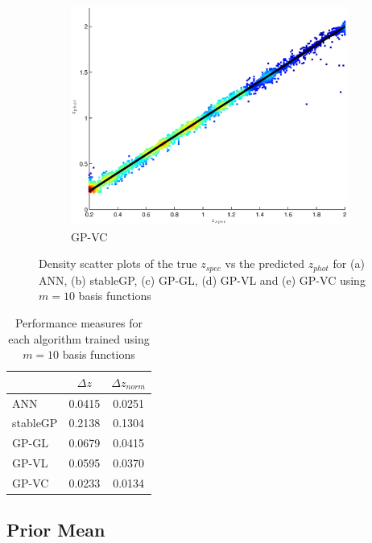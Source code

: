 \documentclass[useAMS,usenatbib,fleqn]{mn2e}
\begin{document}
\begin{figure}
\begin{subfigure}[b]{0.175\textwidth}
                \includegraphics[width=\textwidth]{figures/GPVC.eps}
                \caption{GP-VC}
        \end{subfigure}
        
        \caption{Density scatter plots of the true $z_{spec}$ vs the predicted $z_{phot}$ for (a) ANN, (b) stableGP, (c) GP-GL, (d) GP-VL and (e) GP-VC using $m=10$ basis functions}
        \label{fig-experiment-1}
\end{figure}

 \begin{table}
\caption{Performance measures for each algorithm trained using $m=10$ basis functions}
\begin{center}
  \begin{tabular}{| l | c | c | }
     				&	$\Delta z$	&	$\Delta z_{norm}$	\\	\hline
	ANN		&	0.0415		&	0.0251				\\
	stableGP	&	0.2138		&	0.1304				\\
	GP-GL		&	0.0679		&	0.0415				\\
	GP-VL		&	0.0595		&	0.0370				\\
	GP-VC		&	0.0233		&	0.0134				\\	\hline
  \end{tabular}
  \label{table-experiment-1}
\end{center}
\end{table}

\subsection{Prior Mean}
\end{document}
